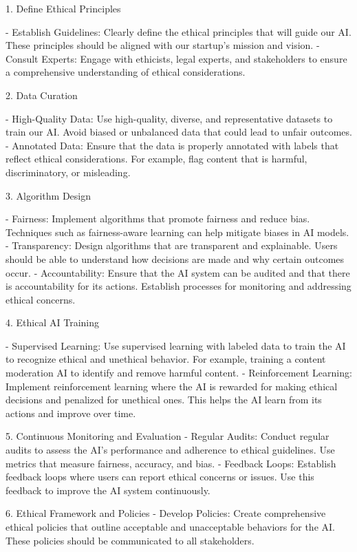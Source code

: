 \documentclass[12pt,letterpaper]{article}
\begin{document}
 1. Define Ethical Principles

- Establish Guidelines: Clearly define the ethical principles that will guide our AI. These principles should be aligned with our startup's mission and vision.
- Consult Experts: Engage with ethicists, legal experts, and stakeholders to ensure a comprehensive understanding of ethical considerations.

 2. Data Curation

- High-Quality Data: Use high-quality, diverse, and representative datasets to train our AI. Avoid biased or unbalanced data that could lead to unfair outcomes.
- Annotated Data: Ensure that the data is properly annotated with labels that reflect ethical considerations. For example, flag content that is harmful, discriminatory, or misleading.

 3. Algorithm Design

- Fairness: Implement algorithms that promote fairness and reduce bias. Techniques such as fairness-aware learning can help mitigate biases in AI models.
- Transparency: Design algorithms that are transparent and explainable. Users should be able to understand how decisions are made and why certain outcomes occur.
- Accountability: Ensure that the AI system can be audited and that there is accountability for its actions. Establish processes for monitoring and addressing ethical concerns.

 4. Ethical AI Training

- Supervised Learning: Use supervised learning with labeled data to train the AI to recognize ethical and unethical behavior. For example, training a content moderation AI to identify and remove harmful content.
- Reinforcement Learning: Implement reinforcement learning where the AI is rewarded for making ethical decisions and penalized for unethical ones. This helps the AI learn from its actions and improve over time.

 5. Continuous Monitoring and Evaluation
- Regular Audits: Conduct regular audits to assess the AI's performance and adherence to ethical guidelines. Use metrics that measure fairness, accuracy, and bias.
- Feedback Loops: Establish feedback loops where users can report ethical concerns or issues. Use this feedback to improve the AI system continuously.

 6. Ethical Framework and Policies
- Develop Policies: Create comprehensive ethical policies that outline acceptable and unacceptable behaviors for the AI. These policies should be communicated to all stakeholders.
\end{document}

